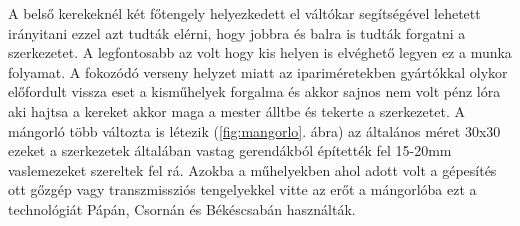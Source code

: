 \documentclass[fontsize=12pt, appendixprefix=true]{scrreprt}
\begin{document}

A belső kerekeknél két főtengely helyezkedett el váltókar segítségével lehetett irányitani ezzel azt tudták elérni, hogy jobbra és balra is tudták forgatni a szerkezetet. A legfontosabb az volt hogy kis helyen is elvéghető legyen ez a munka folyamat. A fokozódó verseny helyzet miatt az ipariméretekben gyártókkal olykor előfordult vissza eset a kisműhelyek forgalma és akkor sajnos nem volt pénz lóra aki hajtsa a kereket akkor maga a mester álltbe és tekerte a szerkezetet. A mángorló több változta is létezik (\ref{fig:mangorlo}. ábra) az általános méret 30x30  ezeket a szerkezetek általában vastag gerendákból építették fel 15-20mm vaslemezeket szereltek fel rá.
Azokba a műhelyekben ahol adott volt a gépesítés ott gőzgép vagy transzmissziós tengelyekkel vitte az erőt a mángorlóba ezt a technológiát Pápán, Csornán és  Békéscsabán használták.
\end{document}
